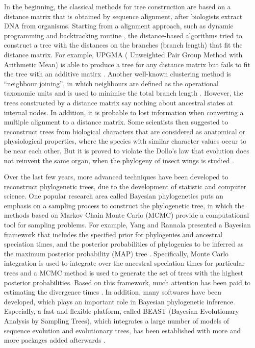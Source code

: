 \documentclass{bmcart}
\begin{document}
In the beginning, the classical methods for tree construction are based on a distance matrix that is obtained by sequence alignment, after biologists extract DNA from organisms. Starting from a alignment approach, such as dynamic programming and  backtracking routine \cite{wang1994complexity}, the distance-based algorithms tried to construct a tree with the distances on the branches (branch length) that fit the distance matrix. For example, UPGMA ( Unweighted Pair Group Method with Arithmetic Mean) is able to produce a tree for any distance matrix but fails to fit the tree with an additive matirx \cite{sokal1963principles}. Another well-known clustering method is ``neighbour joining'', in which neighbours are defined as the operational taxonomic units and is used to minimise the total branch length \cite{saitou1987neighbor}. However, the trees constructed by a distance matrix say nothing about ancestral states at internal nodes. In addition, it is probable to lost information when converting a multiple alignment to a distance matrix. Some scientists then suggested to reconstruct trees from biological characters that are considered as anatomical or physiological properties, where the species with similar character values occur to be near each other. But it is proved to violate the Dollo's law that evolution does not reinvent the same organ, when the phylogeny of insect wings is studied \cite{lynch2010did}.

Over the last few years, more advanced techniques have been developed to reconstruct phylogenetic trees, due to the development of statistic and computer science. One popular research area called Bayesian phylogenetics puts an emphasis on a sampling process to construct the phylogenetic tree, in which the methods based on Markov Chain Monte Carlo (MCMC) provide a computational tool for sampling problems. For example, Yang and Rannala presented a Bayesian framework that includes the specified prior for phylogenies and ancestral speciation times, and the posterior probabilities of phylogenies to be inferred as the maximum posterior probability (MAP) tree \cite{yang1997bayesian}. Specifically, Monte Carlo integration is used to integrate over the ancestral speciation times for particular trees and a MCMC method is used to generate the set of trees with the highest posterior probabilities. Based on this framework, much attention has been paid to estimating the divergence times \cite{rannala2003bayes,yang2003comparison,reis2011approximate}. In addition, many softwares have been developed, which plays an important role in Bayesian phylogenetic inference. Especially,  a fast and flexible platform, called BEAST (Bayesian Evolutionary Analysis by Sampling Trees), which integrates a large number of models of sequence evolution and evolutionary trees, has been established with more and more packages added afterwards \cite{drummond2007beast, bouckaert2014beast} . 
\end{document}

